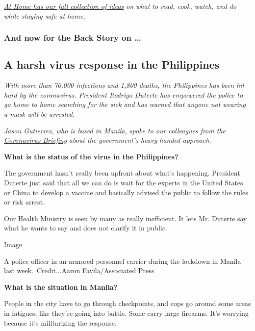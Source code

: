 \href{https://www.nytimes.com/spotlight/at-home}{\emph{At Home has our
full collection of ideas}} \emph{on what to read, cook, watch, and do
while staying safe at home.}

\hypertarget{and-now-for-the-back-story-on-}{%
\subsubsection{And now for the Back Story on
\ldots{}}\label{and-now-for-the-back-story-on-}}

\hypertarget{a-harsh-virus-response-in-the-philippines}{%
\subsection{A harsh virus response in the
Philippines}\label{a-harsh-virus-response-in-the-philippines}}

\emph{With more than 70,000 infections and 1,800 deaths, the Philippines
has been hit hard by the coronavirus. President Rodrigo Duterte has
empowered the police to go home to home searching for the sick and has
warned that anyone not wearing a mask will be arrested.}

\emph{Jason Gutierrez, who is based in Manila, spoke to our colleagues
from the}
\href{https://static.nytimes.com/email-content/CB_sample.html}{\emph{Coronavirus
Briefing}} \emph{about the government's heavy-handed approach.}

\textbf{What is the status of the virus in the Philippines?}

The government hasn't really been upfront about what's happening.
President Duterte just said that all we can do is wait for the experts
in the United States or China to develop a vaccine and basically advised
the public to follow the rules or risk arrest.

Our Health Ministry is seen by many as really inefficient. It lets Mr.
Duterte say what he wants to say and does not clarify it in public.

Image

A police officer in an armored personnel carrier during the lockdown in
Manila last week.~Credit...Aaron Favila/Associated Press

\textbf{What is the situation in Manila?}

People in the city have to go through checkpoints, and cops go around
some areas in fatigues, like they're going into battle. Some carry large
firearms. It's worrying because it's militarizing the response.

